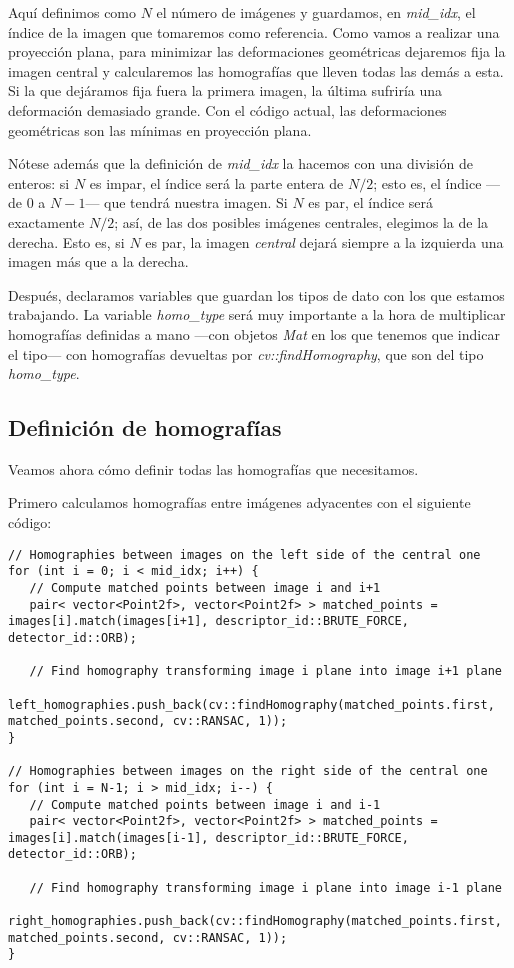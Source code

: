 \documentclass[a4paper, 11pt]{article}
\theoremstyle{definition}
\theoremstyle{theorem}
\begin{document}
   Aquí definimos como $N$ el número de imágenes y guardamos, en \emph{mid\_idx}, el índice de la imagen que tomaremos como referencia. Como vamos a realizar una proyección plana, para minimizar las deformaciones geométricas dejaremos fija la imagen central y calcularemos las homografías que lleven todas las demás a esta. Si la que dejáramos fija fuera la primera imagen, la última sufriría una deformación demasiado grande. Con el código actual, las deformaciones geométricas son las mínimas en proyección plana.

   Nótese además que la definición de \emph{mid\_idx} la hacemos con una división de enteros: si $N$ es impar, el índice será la parte entera de $N/2$; esto es, el índice ---de 0 a $N-1$--- que tendrá nuestra imagen. Si $N$ es par, el índice será exactamente $N/2$; así, de las dos posibles imágenes centrales, elegimos la de la derecha. Esto es, si $N$ es par, la imagen \emph{central} dejará siempre a la izquierda una imagen más que a la derecha.

   Después, declaramos variables que guardan los tipos de dato con los que estamos trabajando. La variable \emph{homo\_type} será muy importante a la hora de multiplicar homografías definidas a mano ---con objetos \emph{Mat} en los que tenemos que indicar el tipo---  con homografías devueltas por \emph{cv::findHomography}, que son del tipo \emph{homo\_type}.

   \subsection{Definición de homografías}
   Veamos ahora cómo definir todas las homografías que necesitamos.

   Primero calculamos homografías entre imágenes adyacentes con el siguiente código:

   \begin{lstlisting}
// Homographies between images on the left side of the central one
for (int i = 0; i < mid_idx; i++) {
   // Compute matched points between image i and i+1
   pair< vector<Point2f>, vector<Point2f> > matched_points = images[i].match(images[i+1], descriptor_id::BRUTE_FORCE, detector_id::ORB);

   // Find homography transforming image i plane into image i+1 plane
   left_homographies.push_back(cv::findHomography(matched_points.first, matched_points.second, cv::RANSAC, 1));
}

// Homographies between images on the right side of the central one
for (int i = N-1; i > mid_idx; i--) {
   // Compute matched points between image i and i-1
   pair< vector<Point2f>, vector<Point2f> > matched_points = images[i].match(images[i-1], descriptor_id::BRUTE_FORCE, detector_id::ORB);

   // Find homography transforming image i plane into image i-1 plane
   right_homographies.push_back(cv::findHomography(matched_points.first, matched_points.second, cv::RANSAC, 1));
}
   \end{lstlisting}
\end{document}

